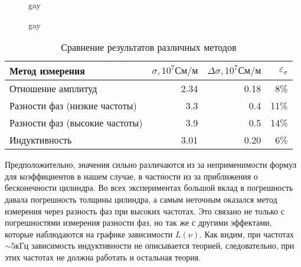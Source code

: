 \documentclass[a4paper, 12pt]{article}
\newcommand{\svg}[3][0.7] {
  \begin{figure}[h]
    \begin{center}
      \fontsize{7}{8}\selectfont
      
      \caption{#3}
    \end{center}
  \end{figure}
}
\begin{document}
\svg{svg/psi2.svg}{gay}
\svg{svg/lnu2.svg}{gay}
%  
% 
% 
% 

\begin{table}[!h]
\begin{center}
\begin{tabular}{lrrr}
Метод измерения & $\sigma, 10^{7} См/м$ & $\Delta\sigma, 10^{7} См/м$ & $\varepsilon_{\sigma}$\\
\hline
Отношение амплитуд & 2.34 & 0.18 & 8\%\\
Разности фаз (низкие частоты) & 3.3 & 0.4 & 11\%\\
Разности фаз (высокие частоты) & 3.9 & 0.5 & 14\%\\
Индуктивность & 3.01 & 0.20 & 6\%\\

\end{tabular}
\end{center}
    \caption{Сравнение результатов различных методов}\label{}
  \end{table}

Предположительно, значения сильно различаются
из за неприменимости формул для коэффициентов в нашем случае, в частности из за
приближения о бесконечности цилиндра. Во всех экспериментах большой вклад в погрешность давала погрешность толщины цилиндра, а самым неточным оказался метод измерения через разность фаз при высоких частотах. Это
связано не только с погрешностями измерения разности фаз, но так же с другими эффектами,
которые наблюдаются на графике зависимости $L(\nu)$. Как видим, при частотах $\sim 5кГц$
зависимость индуктивности не описывается теорией, следовательно, при этих частотах не должна работать и остальная теория.
  
\end{document}
